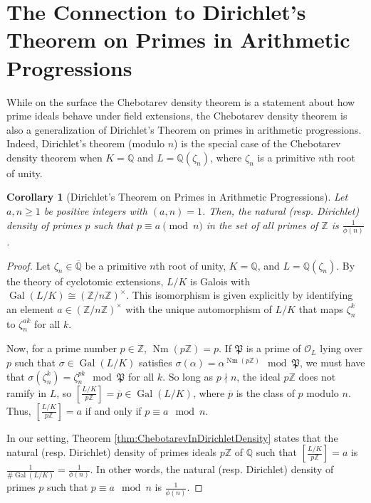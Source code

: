 \documentclass[12pt]{amsart}
\newtheorem{cor}[thm]{Corollary}
\theoremstyle{definition}
\theoremstyle{remark}
\numberwithin{equation}{section}
\newcommand{\cO}{\mathcal O}
\newcommand{\fkP}{\mathfrak{P}}
\newcommand{\bbQ}{\mathbb Q}
\newcommand{\bbZ}{\mathbb Z}
\DeclareMathOperator{\norm}{Nm}
\newcommand{\artin}[2]{\left[ \frac{#1}{#2}\right]}
\DeclareMathOperator{\Gal}{Gal}
\begin{document}
\section{The Connection to Dirichlet's Theorem on Primes in Arithmetic Progressions}\label{sec:DirichletConnection}

While on the surface the Chebotarev density theorem is a statement about how prime ideals behave under field extensions, the Chebotarev density theorem is also a generalization of Dirichlet's Theorem on primes in arithmetic progressions. Indeed, Dirichlet's theorem (modulo $n$) is the special case of the Chebotarev density theorem when $K = \bbQ$ and $L = \bbQ(\zeta_{n})$, where $\zeta_{n}$ is a primitive $n$th root of unity.

\begin{cor}[Dirichlet's Theorem on Primes in Arithmetic Progressions] \label{cor:Dirichlet}
Let $a,n \geq 1$ be positive integers with $(a,n) = 1$. Then, the natural (resp. Dirichlet) density of primes $p$ such that $p \equiv a \pmod{n}$ in the set of all primes of $\bbZ$ is $\frac{1}{\phi(n)}$.
\end{cor}

\begin{proof}
Let $\zeta_{n} \in \overline{\bbQ}$ be a primitive $n$th root of unity, $K = \bbQ$, and $L = \bbQ(\zeta_{n})$. By the theory of cyclotomic extensions, $L/K$ is Galois with $\Gal(L/K) \cong (\bbZ/n\bbZ)^{\times}$. This isomorphism is given explicitly by identifying an element $a \in (\bbZ/n\bbZ)^{\times}$ with the unique automorphism of $L/K$ that maps $\zeta_{n}^{k}$ to $\zeta_{n}^{ak}$ for all $k$.

Now, for a prime number $p \in \bbZ$, $\norm(p\bbZ) = p$. If $\fkP$ is a prime of $\cO_L$ lying over $p$ such that $\sigma \in \Gal(L/K)$ satisfies $\sigma(\alpha) = \alpha^{\norm(p\bbZ)} \mod \fkP$, we must have that $\sigma(\zeta^{k}_n) = \zeta_{n}^{pk} \mod \fkP$ for all $k$. So long as $p\nmid n$, the ideal $p\bbZ$ does not ramify in $L$, so $\artin{L/K}{p\bbZ} = \overline{p} \in \Gal(L/K)$, where $\overline{p}$ is the class of $p$ modulo $n$. Thus, $\artin{L/K}{p\bbZ} = a$ if and only if $p \equiv a \mod n$.

In our setting, Theorem \ref{thm:ChebotarevInDirichletDensity} states that the natural (resp. Dirichlet) density of primes ideals $p \bbZ$ of $\bbQ$ such that $\artin{L/K}{p\bbZ} = a$ is $\frac{1}{\# \Gal(L/K)} = \frac{1}{\phi(n)}$. In other words, the natural (resp. Dirichlet) density of primes $p$ such that $p \equiv a \mod n$ is $\frac{1}{\phi(n)}$.
\end{proof}
\end{document}
